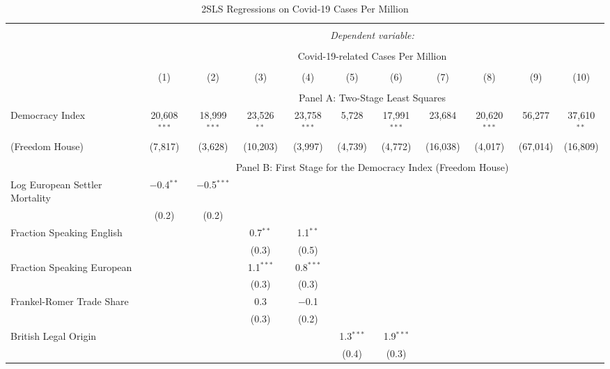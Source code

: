 
\begin{table}[!htbp] \centering
  \caption{2SLS Regressions on Covid-19 Cases Per Million}
  \label{tab:2sls-cases} 
  \footnotesize
  \begin{threeparttable}
\begin{tabular}{@{\extracolsep{0pt}}lcccccccccc} 
\\[-1.8ex]\hline 
\hline \\[-1.8ex] 
 & \multicolumn{10}{c}{\textit{Dependent variable:}} \\ 
\cline{2-11} 
\\[-1.8ex] & \multicolumn{10}{c}{Covid-19-related Cases Per Million} \\ 
\\[-1.8ex] & (1) & (2) & (3) & (4) & (5) & (6) & (7) & (8) & (9) & (10)\\ 
\hline \\[-1.8ex] 
  & \multicolumn{10}{c}{Panel A: Two-Stage Least Squares} \\
 Democracy Index & 20,608$^{***}$ & 18,999$^{***}$ & 23,526$^{**}$ & 23,758$^{***}$ & 5,728 & 17,991$^{***}$ & 23,684 & 20,620$^{***}$ & 56,277 & 37,610$^{**}$ \\ 
 (Freedom House) & (7,817) & (3,628) & (10,203) & (3,997) & (4,739) & (4,772) & (16,038) & (4,017) & (67,014) & (16,809) \\ 
\hline \\[-1.8ex] 
   & \multicolumn{10}{c}{Panel B: First Stage for the Democracy Index (Freedom House)} \\
  Log European Settler Mortality & $-$0.4$^{**}$ & $-$0.5$^{***}$ &  &  &  &  &  &  &  &  \\ 
  & (0.2) & (0.2) &  &  &  &  &  &  &  &  \\ 
  Fraction Speaking English &  &  & 0.7$^{**}$ & 1.1$^{**}$ &  &  &  &  &  &  \\ 
  &  &  & (0.3) & (0.5) &  &  &  &  &  &  \\ 
  Fraction Speaking European &  &  & 1.1$^{***}$ & 0.8$^{***}$ &  &  &  &  &  &  \\ 
  &  &  & (0.3) & (0.3) &  &  &  &  &  &  \\ 
  Frankel-Romer Trade Share &  &  & 0.3 & $-$0.1 &  &  &  &  &  &  \\ 
  &  &  & (0.3) & (0.2) &  &  &  &  &  &  \\ 
  British Legal Origin &  &  &  &  & 1.3$^{***}$ & 1.9$^{***}$ &  &  &  &  \\ 
  &  &  &  &  & (0.4) & (0.3) &  &  &  &  \\ 

\end{tabular}
\end{threeparttable}
\end{table}
